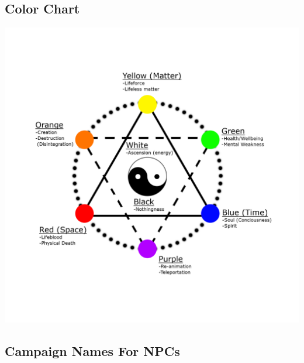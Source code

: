 \subsection{Color Chart}

\includegraphics[width=\linewidth]{img/ColorChart.png}

\subsection{Campaign Names For NPCs}

